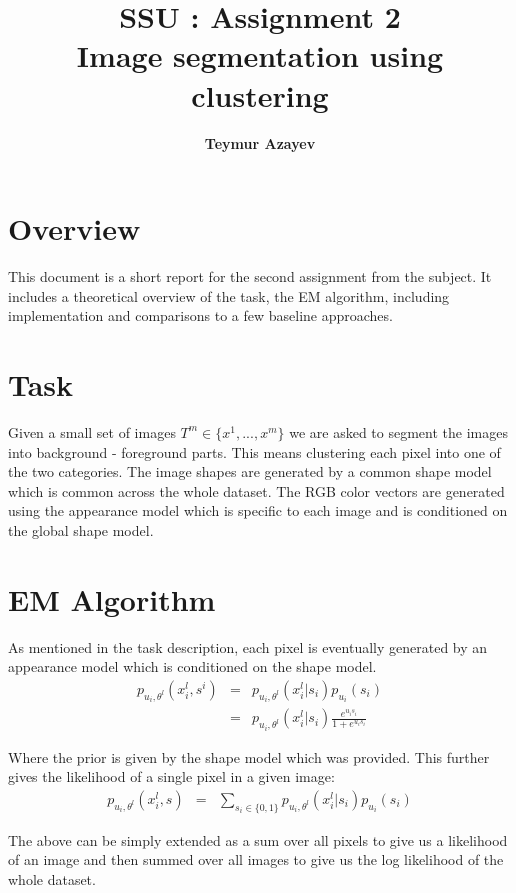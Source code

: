 \documentclass[11pt]{article}
\title{\textbf{SSU : Assignment 2} \\ \textbf{Image segmentation using clustering}}
\author{\textbf{Teymur Azayev}}
\date{}
\begin{document}
\maketitle

\section{Overview}

This document is a short report for the second assignment from the subject. It includes a theoretical overview of the task, the EM algorithm, including implementation and comparisons to a few baseline approaches.

\section{Task}
Given a small set of images $T^m \in\{x^1, ... , x^m\}$ we are asked to segment the images into background - foreground parts. This means clustering each pixel into one of the two categories. The image shapes are generated by a common shape model which is common across the whole dataset. The RGB color vectors are generated using the appearance model which is specific to each image and is conditioned on the global shape model.


\section{EM Algorithm}
As mentioned in the task description, each pixel is eventually generated by an appearance model which is conditioned on the shape model. \\ 

\begin{eqnarray}
p_{u_i,\theta^l}(x_i^l,s^i) &=& p_{u_i,\theta^l}(x_i^l|s_i) p_{u_i}(s_i) \\
&=& p_{u_i,\theta^l}(x_i^l|s_i) \frac{e^{u_is_i}}{1 + e^{u_is_i}}
\end{eqnarray}

Where the prior is given by the shape model which was provided. This further gives the likelihood of a single pixel
in a given image: \\

\begin{eqnarray}
p_{u_i,\theta^l}(x_i^l,s) &=& \sum_{s_i\in\{0,1\}}{p_{u_i,\theta^l}(x_i^l|s_i) p_{u_i}(s_i) } 
\end{eqnarray}

The above can be simply extended as a sum over all pixels to give us a likelihood of an image and then summed over all images to give us the log likelihood of the whole dataset. \\ 
\end{document}
